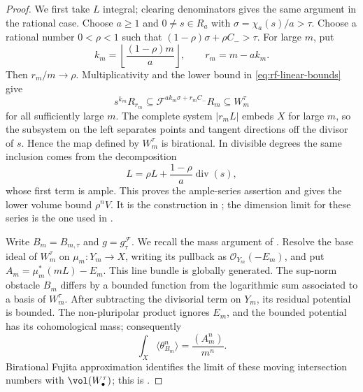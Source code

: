 \begin{proof}
We first take $L$ integral; clearing denominators gives the same argument in the rational case. Choose $a\geq1$ and $0\ne s\in R_a$ with $\sigma=\chi_a(s)/a>\tau$. Choose a rational number $0<\rho<1$ such that $(1-\rho)\sigma+\rho C_->\tau$. For large $m$, put
\[
 k_m=\left\lfloor\frac{(1-\rho)m}{a}\right\rfloor,
 \qquad r_m=m-a k_m.
\]
Then $r_m/m\to\rho$. Multiplicativity and the lower bound in \eqref{eq:rf-linear-bounds} give
\[
 s^{k_m}R_{r_m}\subseteq
 \mathcal F^{a k_m\sigma+r_m C_-}R_m
 \subseteq W^\tau_m
\]
for all sufficiently large $m$. The complete system $|r_mL|$ embeds $X$ for large $m$, so the subsystem on the left separates points and tangent directions off the divisor of $s$. Hence the map defined by $W^\tau_m$ is birational. In divisible degrees the same inclusion comes from the decomposition
\[
 L=\rho L+\frac{1-\rho}{a}\operatorname{div}(s),
\]
whose first term is ample. This proves the ample-series assertion and gives the lower volume bound $\rho^nV$. It is the construction in \cite[Lemma~1.6, p.~1212]{BC11}; the dimension limit for these series is the one used in \cite[proof of Theorem~1.11, pp.~1213--1214]{BC11}.

Write $B_m=B_{m,\tau}$ and $g=g^{\mathcal F}_\tau$. We recall the mass argument of \cite[Theorem~3 and Propositions~17 and~19]{His13}. Resolve the base ideal of $W^\tau_m$ on $\mu_m:Y_m\to X$, writing its pullback as $\mathcal O_{Y_m}(-E_m)$, and put $A_m=\mu_m^*(mL)-E_m$. This line bundle is globally generated. The sup-norm obstacle $B_m$ differs by a bounded function from the logarithmic sum associated to a basis of $W^\tau_m$. After subtracting the divisorial term on $Y_m$, its residual potential is bounded. The non-pluripolar product ignores $E_m$, and the bounded potential has its cohomological mass; consequently
\[
                    \int_X\langle\theta_{B_m}^n\rangle
                       =\frac{(A_m^n)}{m^n}.
\]
Birational Fujita approximation identifies the limit of these moving intersection numbers with $\vol(W^\tau_\bullet)$; this is \cite[Proposition~17, pp.~238--239]{His13}.


\end{proof}
